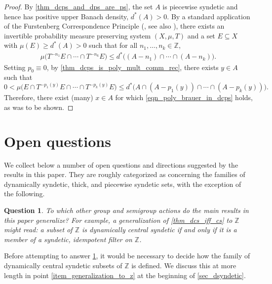 \documentclass[letter,11pt]{article}
\theoremstyle{plain}
\newtheorem{question}[theorem]{Question}
\theoremstyle{definition}
\theoremstyle{plain}
\theoremstyle{plain}
\numberwithin{equation}{section}
\newcommand{\Z}{\mathbb{Z}}
\renewcommand{\leq}{\leqslant}
\renewcommand{\geq}{\geqslant}
\begin{document}
\begin{proof}
    By \cref{thm_dcps_and_dps_are_ps}, the set $A$ is piecewise syndetic and hence has positive upper Banach density, $d^*(A) > 0$. By a standard application of the Furstenberg Correspondence Principle (\cite[Thm. 1.1]{Furstenberg-ErgodicBehavior}, see also \cite[Thm. 3.2.5]{mccutcheon_1999}), there exists an invertible probability measure preserving system $(X, \mu, T)$ and a set $E \subseteq X$ with $\mu(E) \geq d^*(A) > 0$ such that for all $n_1, \ldots, n_k \in \Z$,
    \begin{align*}
        \mu \big(T^{-n_1} E \cap \cdots \cap T^{-n_k} E \big) \leq d^* \big( (A-n_1) \cap \cdots \cap (A-n_k) \big).
    \end{align*}
    Setting $p_0 \equiv 0$, by \cref{thm_dcps_is_poly_mult_comm_rec}, there exists $y \in A$ such that
    \[
        0 < \mu \big(E \cap T^{-p_1(y)} E \cap \cdots \cap T^{-p_k(y)} E \big) \leq d^* \big( A \cap (A-p_1(y)) \cap \cdots \cap (A-p_k(y)) \big).
    \]
    Therefore, there exist (many) $x \in A$ for which \eqref{eqn_poly_brauer_in_dcps} holds, as was to be shown.
\end{proof}

\section{Open questions}
\label{sec:open_questions}

We collect below a number of open questions and directions suggested by the results in this paper. They are roughly categorized as concerning the families of dynamically syndetic, thick, and piecewise syndetic sets, with the exception of the following.

\begin{question}
\label{quest_generalizations_to_other_grps}
    To which other group and semigroup actions do the main results in this paper generalize?  For example, a generalization of \cref{thm_dcs_iff_cs} to $\Z$ might read: a subset of $\Z$ is dynamically central syndetic if and only if it is a member of a syndetic, idempotent filter on $\Z$.
\end{question}

Before attempting to answer \cref{quest_generalizations_to_other_grps}, it would be necessary to decide how the family of dynamically central syndetic subsets of $\Z$ is defined.  We discuss this at more length in point \eqref{item_generalization_to_z} at the beginning of \cref{sec_dsyndetic}.
\end{document}
